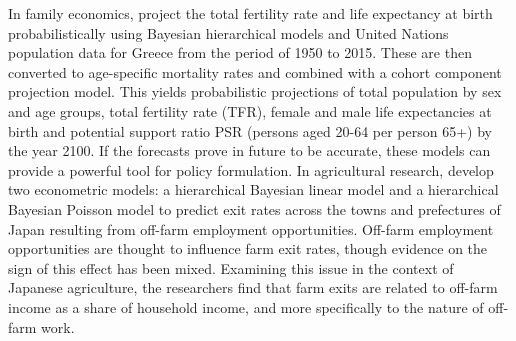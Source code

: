 In family economics, \cite{lamnisos2019demographic} project the total fertility rate and life expectancy at birth probabilistically using Bayesian hierarchical models and United Nations population data for Greece from the period of 1950 to 2015. These are then converted to age-specific mortality rates and combined with a cohort component projection model. This yields probabilistic projections of total population by sex and age groups, total fertility rate (TFR), female and male life expectancies at birth and potential support ratio PSR (persons aged 20-64 per person 65+) by the year 2100. If the forecasts prove in future to be accurate, these models can provide a powerful tool for policy formulation. In agricultural research, \cite{ ramsey2019saying} develop two econometric models: a hierarchical Bayesian linear model and a hierarchical Bayesian Poisson model to predict exit rates across the towns and prefectures of Japan resulting from off-farm employment opportunities. Off-farm employment opportunities are thought to influence farm exit rates, though evidence on the sign of this effect has been mixed. Examining this issue in the context of Japanese agriculture, the researchers find that farm exits are related to off-farm income as a share of household income, and more specifically to the nature of off-farm work.

